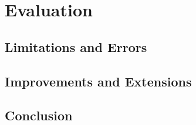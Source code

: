 
\section{Evaluation}
\subsection{Limitations and Errors}
\subsection{Improvements and Extensions}
\subsection{Conclusion}
